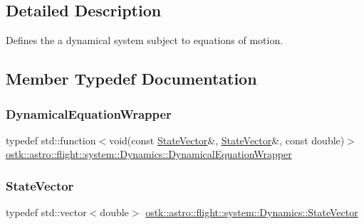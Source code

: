 \subsection{Detailed Description}
Defines the a dynamical system subject to equations of motion. 

\subsection{Member Typedef Documentation}
\mbox{\label{classostk_1_1astro_1_1flight_1_1system_1_1_dynamics_a9b14f4fbea6fe1e96af9e71545d4c77e}} 
\subsubsection{\texorpdfstring{Dynamical\+Equation\+Wrapper}{DynamicalEquationWrapper}}
{\footnotesize\ttfamily typedef std\+::function$<$void(const \hyperlink{classostk_1_1astro_1_1flight_1_1system_1_1_dynamics_a7a04f804b15e0f12d76f3f1f437f5169}{State\+Vector}\&, \hyperlink{classostk_1_1astro_1_1flight_1_1system_1_1_dynamics_a7a04f804b15e0f12d76f3f1f437f5169}{State\+Vector}\&, const double)$>$ \hyperlink{classostk_1_1astro_1_1flight_1_1system_1_1_dynamics_a9b14f4fbea6fe1e96af9e71545d4c77e}{ostk\+::astro\+::flight\+::system\+::\+Dynamics\+::\+Dynamical\+Equation\+Wrapper}}

\mbox{\label{classostk_1_1astro_1_1flight_1_1system_1_1_dynamics_a7a04f804b15e0f12d76f3f1f437f5169}} 
\subsubsection{\texorpdfstring{State\+Vector}{StateVector}}
{\footnotesize\ttfamily typedef std\+::vector$<$double$>$ \hyperlink{classostk_1_1astro_1_1flight_1_1system_1_1_dynamics_a7a04f804b15e0f12d76f3f1f437f5169}{ostk\+::astro\+::flight\+::system\+::\+Dynamics\+::\+State\+Vector}}



